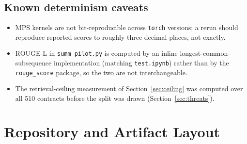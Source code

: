 \section*{Known determinism caveats}
\begin{itemize}[itemsep=2pt]
  \item MPS kernels are not bit-reproducible across \texttt{torch} versions; a rerun should reproduce reported scores to roughly three decimal places, not exactly.
  \item ROUGE-L in \texttt{summ\_pilot.py} is computed by an inline longest-common-subsequence implementation (matching \texttt{test.ipynb}) rather than by the \texttt{rouge\_score} package, so the two are not interchangeable.
  \item The retrieval-ceiling measurement of Section~\ref{sec:ceiling} was computed over all 510 contracts before the split was drawn (Section~\ref{sec:threats}).
\end{itemize}

\chapter{Repository and Artifact Layout}
\label{app:repo}


